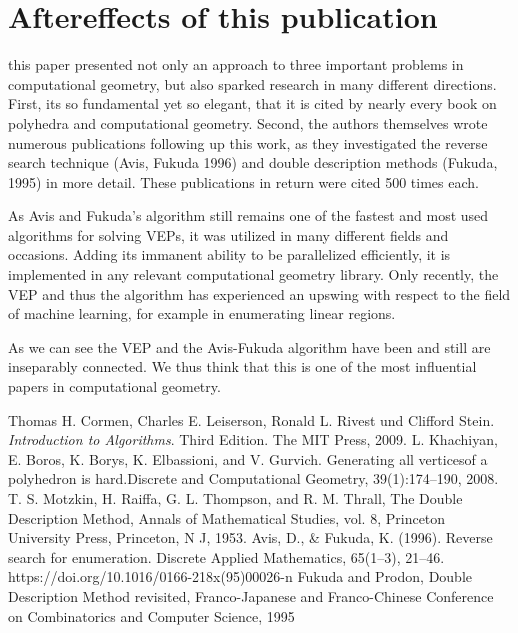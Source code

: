 \documentclass[a4paper, 11pt]{article}
\begin{document}
\section{Aftereffects of this publication}

this paper presented not only an approach to three important problems in computational geometry, but also sparked research in many different directions. First, its so fundamental yet so elegant, that it is cited by nearly every book on polyhedra and computational geometry. Second, the authors themselves wrote numerous publications following up this work, as they investigated the reverse search technique (Avis, Fukuda 1996)\cite{AvisReverseSearch} and double description methods (Fukuda, 1995)\cite{FukudaDoubleDescr} in more detail. These publications in return were cited 500 times each. \medskip
 
As Avis and Fukuda's algorithm still remains one of the fastest and most used algorithms for solving VEPs, it was utilized in many different fields and occasions. Adding its immanent ability to be parallelized efficiently, it is implemented in any relevant computational geometry library. Only recently, the VEP and thus the algorithm has experienced an upswing with respect to the field of machine learning, for example in enumerating linear regions.\medskip

As we can see the VEP and the Avis-Fukuda algorithm have been and still are inseparably connected. We thus think that this is one of the most influential papers in computational geometry.


\newpage

\begin{thebibliography}{9}
	Thomas H. Cormen, Charles E. Leiserson, Ronald L. Rivest und Clifford Stein.
	\textit{Introduction to Algorithms}. Third Edition. The MIT Press, 2009.
	L. Khachiyan, E. Boros, K. Borys, K. Elbassioni, and V. Gurvich. Generating all
	verticesof a polyhedron is hard.Discrete and Computational Geometry,
	39(1):174–190, 2008.
	T. S. Motzkin, H. Raiffa, G. L. Thompson, and R. M. Thrall, The Double Description Method,
	Annals of Mathematical Studies, vol. 8, Princeton University Press, Princeton, N J, 1953.
	Avis, D., \& Fukuda, K. (1996). Reverse search for enumeration. Discrete Applied Mathematics, 65(1–3), 21–46. https://doi.org/10.1016/0166-218x(95)00026-n
	Fukuda and Prodon, Double Description Method revisited,  Franco-Japanese and Franco-Chinese Conference on Combinatorics and Computer Science, 1995
\end{thebibliography}
\end{document}
